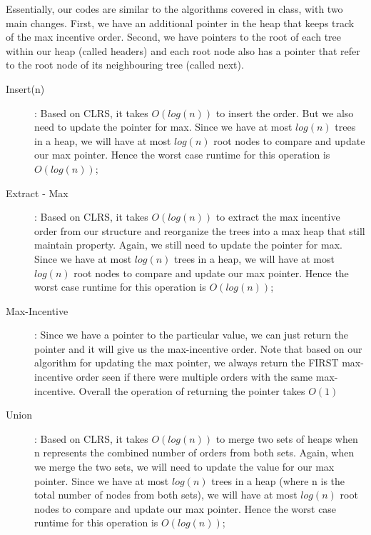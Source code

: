 \documentclass[20pt]{article}
\begin{document}
\noindent
\begin{text}
    Essentially, our codes are similar to the algorithms covered in class, with two main changes. First, we have an additional pointer in the heap that keeps track of the max incentive order. Second, we have pointers to the root of each tree within our heap (called headers) and each root node also has a pointer that refer to the root node of its neighbouring tree (called next).  
\end{text}

\begin{description}
    \item[Insert(n)]: Based on CLRS, it takes $O(log(n))$ to insert the order. But we also need to update the pointer for max. Since we have at most $log(n)$ trees in a heap, we will have at most $log(n)$ root nodes to compare and update our max pointer. Hence the worst case runtime for this operation is $O(log(n))$;
    
    \item[Extract - Max]: Based on CLRS, it takes $O(log(n))$ to extract the max incentive order from our structure and reorganize the trees into a max heap that still maintain property. Again, we still need to update the pointer for max. Since we have at most $log(n)$ trees in a heap, we will have at most $log(n)$ root nodes to compare and update our max pointer. Hence the worst case runtime for this operation is $O(log(n))$;
    
    \item[Max-Incentive]: Since we have a pointer to the particular value, we can just return the pointer and it will give us the max-incentive order. Note that based on our algorithm for updating the max pointer, we always return the FIRST max-incentive order seen if there were multiple orders with the same max-incentive. Overall the operation of returning the pointer takes $O(1)$
    
    \item[Union]: Based on CLRS, it takes $O(log(n))$ to merge two sets of heaps when n represents the combined number of orders from both sets. Again, when we merge the two sets, we will need to update the value for our max pointer. Since we have at most $log(n)$ trees in a heap (where n is the total number of nodes from both sets), we will have at most $log(n)$ root nodes to compare and update our max pointer. Hence the worst case runtime for this operation is $O(log(n))$;
\end{description}
\end{document}
